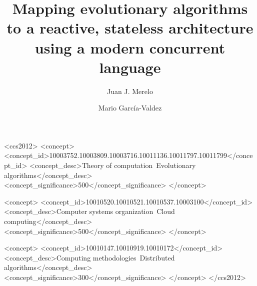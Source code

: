 \documentclass[sigconf]{acmart}
\begin{document}
\title{Mapping evolutionary algorithms to a reactive, stateless architecture
  using a modern concurrent language}

\author{Juan J. Merelo}

\author{Mario García-Valdez}

\renewcommand{\shortauthors}{J. J. Merelo et al.}

\begin{abstract}
\end{abstract}

\begin{CCSXML}
<ccs2012>
<concept>
<concept_id>10003752.10003809.10003716.10011136.10011797.10011799</concept_id>
<concept_desc>Theory of computation~Evolutionary algorithms</concept_desc>
<concept_significance>500</concept_significance>
</concept>

<concept>
<concept_id>10010520.10010521.10010537.10003100</concept_id>
<concept_desc>Computer systems organization~Cloud computing</concept_desc>
<concept_significance>500</concept_significance>
</concept>

<concept>
<concept_id>10010147.10010919.10010172</concept_id>
<concept_desc>Computing methodologies~Distributed algorithms</concept_desc>
<concept_significance>300</concept_significance>
</concept>
</ccs2012>
\end{CCSXML}




\maketitle
\end{document}
